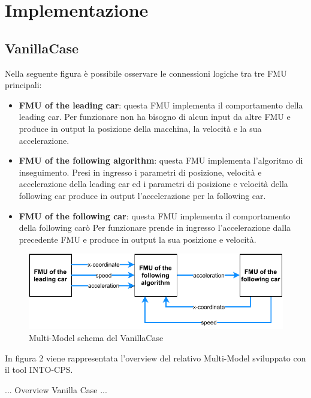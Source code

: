\section{Implementazione}
\subsection{VanillaCase}
Nella seguente figura è possibile osservare le connessioni logiche tra tre FMU principali: 
\begin{itemize}
	\item \textbf{FMU of the leading car}: questa FMU implementa il comportamento della leading car. Per funzionare non ha bisogno di alcun input da altre FMU e produce in output la posizione della macchina, la velocità e la sua accelerazione. 
	\item \textbf{FMU of the following algorithm}: questa FMU implementa l'algoritmo di inseguimento. Presi in ingresso i parametri di posizione, velocità e accelerazione della leading car ed i parametri di posizione e velocità della following car produce in output l'accelerazione per la following car.
	\item \textbf{FMU of the following car}: questa FMU implementa il comportamento della following carò Per funzionare prende in ingresso l'accelerazione dalla precedente FMU e produce in output la sua posizione e velocità.
\end{itemize}
\begin{figure}[H]
	\centering
	\includegraphics{img/VanillaSchema.pdf}
	\caption{Multi-Model schema del VanillaCase}
\end{figure}

In figura 2 viene rappresentata l'overview del relativo Multi-Model sviluppato con il tool INTO-CPS. 

... Overview Vanilla Case ...

